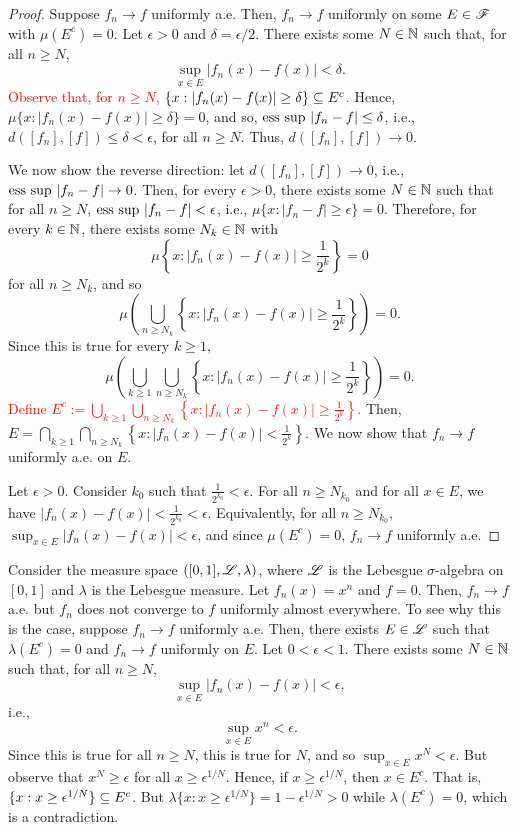 \begin{proof}
    Suppose $f_n \to f$ uniformly a.e. Then, $f_n \to f$ uniformly on some $E \in \mathscr{F}$ with $\mu(E^c) = 0$. Let $\epsilon > 0$ and $\delta = \epsilon / 2$. There exists some $N \in \mathbb{N}$ such that, for all $n \geq N$, 
    $$ \sup_{x \in E} |f_n(x) - f(x)| < \delta. $$
    \textcolor{red}{Observe that, for $n \geq N$, $ \{ x : |f_n(x) - f(x)| \geq \delta \} \subseteq E^c$.} Hence, $\mu \{ x : |f_n(x) - f(x)| \geq \delta \} = 0$, and so, $\text{ess sup } |f_n - f| \leq \delta$, i.e., $d([f_n], [f]) \leq \delta < \epsilon$, for all $n \geq N$. Thus, $d([f_n], [f]) \to 0$.

    We now show the reverse direction: let $d([f_n], [f]) \to 0$, i.e., $\text{ess sup } |f_n - f| \to 0$. Then, for every $\epsilon > 0$, there exists some $N \in \mathbb{N}$ such that for all $n \geq N$, $\text{ess sup } |f_n - f| < \epsilon$, i.e., $\mu \{ x : |f_n - f| \geq \epsilon \} = 0$. Therefore, for every $k \in \mathbb{N}$, there exists some $N_k \in \mathbb{N}$ with 
    $$ \mu \left \{ x : |f_n(x) - f(x)| \geq \frac{1}{2^k} \right \} = 0 $$
    for all $n \geq N_k$, and so
    $$ \mu \left( \bigcup_{n \geq N_k} \left \{ x : |f_n(x) - f(x)| \geq \frac{1}{2^k} \right \} \right) = 0 .$$
    Since this is true for every $k \geq 1$, 
    $$ \mu \left( \bigcup_{k \geq 1} \bigcup_{n \geq N_k} \left \{ x : |f_n(x) - f(x)| \geq \frac{1}{2^k} \right \} \right) = 0 .$$
    \textcolor{red}{Define $E^c := \bigcup_{k \geq 1} \bigcup_{n \geq N_k} \left \{ x : |f_n(x) - f(x)| \geq \frac{1}{2^k} \right \}$.} Then, $E = \bigcap_{k \geq 1} \bigcap_{n \geq N_k} \left \{ x : |f_n(x) - f(x)| < \frac{1}{2^k} \right \}$. We now show that $f_n \to f$ uniformly a.e. on $E$. 

    Let $\epsilon > 0$. Consider $k_0$ such that $\frac{1}{2^{k_0}} < \epsilon$. For all $n \geq N_{k_0}$ and for all $x \in E$, we have $|f_n(x) - f(x)| < \frac{1}{2^{k_0}} < \epsilon$. Equivalently, for all $n \geq N_{k_0}$, $\sup_{x \in E} |f_n(x) - f(x)| < \epsilon$, and since $\mu(E^c) = 0$, $f_n \to f$ uniformly a.e.

\end{proof}

\begin{example}
    Consider the measure space $([0,1], \mathscr{L}, \lambda)$, where $\mathscr{L}$ is the Lebesgue $\sigma$-algebra on $[0,1]$ and $\lambda$ is the Lebesgue measure. Let $f_n(x) = x^n$ and $f = 0$. Then, $f_n \to f$ a.e. but $f_n$ does not converge to $f$ uniformly almost everywhere. To see why this is the case, suppose $f_n \to f$ uniformly a.e. Then, there exists $E \in \mathscr{L}$ such that $\lambda(E^c) = 0$ and $f_n \to f$ uniformly on $E$. Let $0 < \epsilon < 1$. There exists some $N \in \mathbb{N}$ such that, for all $n \geq N$, 
    $$ \sup_{x \in E} |f_n(x) - f(x)| < \epsilon, $$
    i.e., 
    $$ \sup_{x \in E} x^n < \epsilon.$$
    Since this is true for all $n \geq N$, this is true for $N$, and so $\sup_{x \in E} x^N < \epsilon$. But observe that $x^N \geq \epsilon$ for all $x \geq \epsilon^{1/N}$. Hence, if $x \geq \epsilon^{1/N}$, then $x \in E^c$. That is, $\{ x : x \geq \epsilon^{1/N} \} \subseteq E^c$. But $\lambda \{ x : x \geq \epsilon^{1/N} \} = 1 - \epsilon^{1/N} > 0$ while $\lambda(E^c) = 0$, which is a contradiction. 
\end{example}

